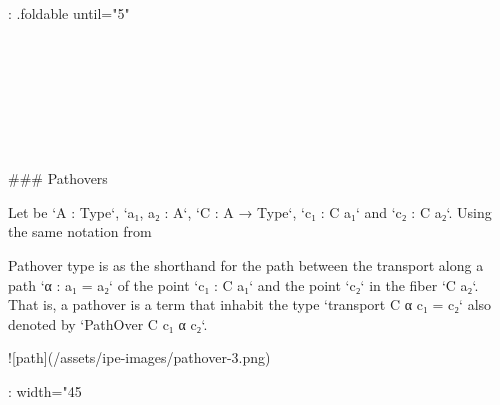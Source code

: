 {{: .foldable until="5" }
\begin{code}%
\>[0]\<%
\\
\>[0][@{}l@{\AgdaIndent{0}}]%
\>[2]\AgdaSymbol{:}\AgdaSpace{}%
\AgdaSpace{}%
\AgdaSymbol{\{}\AgdaSpace{}%
\AgdaSpace{}%
\AgdaSymbol{:}\AgdaSpace{}%
\AgdaSpace{}%
\AgdaSymbol{\}}\<%
\\
%
\>[2]\AgdaSpace{}%
\AgdaSpace{}%
\AgdaOperator{\AgdaDatatype{==}}\AgdaSpace{}%
\<%
\\
%
\>[2]\AgdaComment{---------}\<%
\\
%
\>[2]\AgdaSpace{}%
\AgdaSymbol{(}\AgdaSpace{}%
\AgdaSpace{}%
\AgdaSymbol{)}\<%
\\
%
\\[\AgdaEmptyExtraSkip]%
\>[0]\AgdaSpace{}%
\AgdaSpace{}%
\AgdaSpace{}%
\AgdaSymbol{=}\AgdaSpace{}%
\AgdaSpace{}%
\AgdaSpace{}%
\AgdaSpace{}%
\AgdaSpace{}%
\AgdaSymbol{)}\AgdaSpace{}%
\AgdaSpace{}%
\<%
\end{code}

### Pathovers

Let be `A : Type`, `a₁, a₂ : A`, `C : A → Type`, `c₁ : C a₁` and `c₂ : C a₂`.
Using the same notation from {%
Pathover type is as the shorthand for the path between the transport along a
path `α : a₁ = a₂` of the point `c₁ : C a₁` and the point `c₂` in the fiber `C
a₂`. That is, a pathover is a term that inhabit the type `transport C α c₁ = c₂`
also denoted by `PathOver C c₁ α c₂`.

![path](/assets/ipe-images/pathover-3.png){: width="45%

}}}
